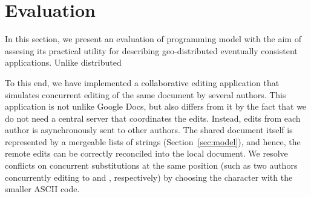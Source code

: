 \section{Evaluation}
\label{sec:evaluation}

In this section, we present an evaluation of \name programming model with the
aim of assesing its practical utility for describing geo-distributed eventually
consistent applications. Unlike distributed

To this end, we have implemented a collaborative editing application that
simulates concurrent editing of the same document by several authors. This
application is not unlike Google Docs, but also differs from it by the fact
that we do not need a central server that coordinates the edits. Instead, edits
from each author is asynchronously sent to other authors. The shared document
itself is represented by a mergeable lists of strings
(Section~\ref{sec:model}), and hence, the remote edits can be correctly
reconciled into the local document. We resolve conflicts on concurrent
substitutions at the same position (such as two authors concurrently editing
 to  and , respectively) by choosing the character with
the smaller ASCII code.
